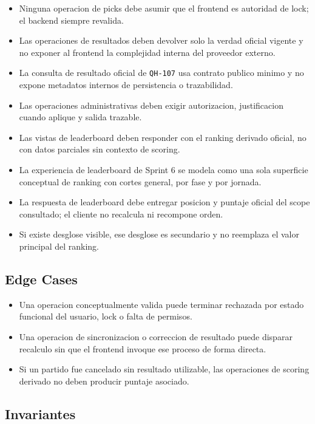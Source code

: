 \begin{itemize}
  \item Ninguna operacion de picks debe asumir que el frontend es autoridad de lock; el backend siempre revalida.
  \item Las operaciones de resultados deben devolver solo la verdad oficial vigente y no exponer al frontend la complejidad interna del proveedor externo.
  \item La consulta de resultado oficial de \texttt{QH-107} usa contrato publico minimo y no expone metadatos internos de persistencia o trazabilidad.
  \item Las operaciones administrativas deben exigir autorizacion, justificacion cuando aplique y salida trazable.
  \item Las vistas de leaderboard deben responder con el ranking derivado oficial, no con datos parciales sin contexto de scoring.
  \item La experiencia de leaderboard de Sprint 6 se modela como una sola superficie conceptual de ranking con cortes general, por fase y por jornada.
  \item La respuesta de leaderboard debe entregar posicion y puntaje oficial del scope consultado; el cliente no recalcula ni recompone orden.
  \item Si existe desglose visible, ese desglose es secundario y no reemplaza el valor principal del ranking.
\end{itemize}

\subsection{Edge Cases}

\begin{itemize}
  \item Una operacion conceptualmente valida puede terminar rechazada por estado funcional del usuario, lock o falta de permisos.
  \item Una operacion de sincronizacion o correccion de resultado puede disparar recalculo sin que el frontend invoque ese proceso de forma directa.
  \item Si un partido fue cancelado sin resultado utilizable, las operaciones de scoring derivado no deben producir puntaje asociado.
\end{itemize}

\subsection{Invariantes}

